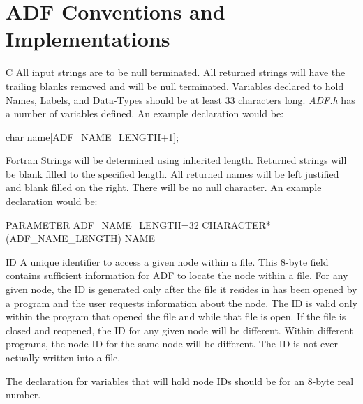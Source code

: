 \section{ADF Conventions and Implementations}
\label{s:conventions}
\thispagestyle{plain}

\begin{Ventryi}{}
\item [C]
      All input strings are to be null terminated.
      All returned strings will have the trailing blanks removed and
      will be null terminated.
      Variables declared to hold Names, Labels, and Data-Types should
      be at least 33 characters long.
      \textit{ADF.h} has a number of variables defined.
      An example declaration would be:
\begin{indlefttt}
char name[ADF\_NAME\_LENGTH+1];
\end{indlefttt}
\item [Fortran]
      Strings will be determined using inherited length.
      Returned strings will be blank filled to the specified length.
      All returned names will be left justified and blank filled on the
      right.
      There will be no null character.
      An example declaration would be:
\begin{indlefttt}
PARAMETER ADF\_NAME\_LENGTH=32
CHARACTER*(ADF\_NAME\_LENGTH) NAME
\end{indlefttt}
\item [ID]
      A unique identifier to access a given node within a file.
      This 8-byte field contains sufficient information for ADF to
      locate the node within a file.
      For any given node, the ID is generated only after the file it
      resides in has been opened by a program and the user requests
      information about the node.
      The ID is valid only within the program that opened the file and
      while that file is open.
      If the file is closed and reopened, the ID for any given node
      will be different.
      Within different programs, the node ID for the same node will be
      different.
      The ID is not ever actually written into a file.

      The declaration for variables that will hold node IDs should be
      for an 8-byte real number.


\end{Ventryi}

